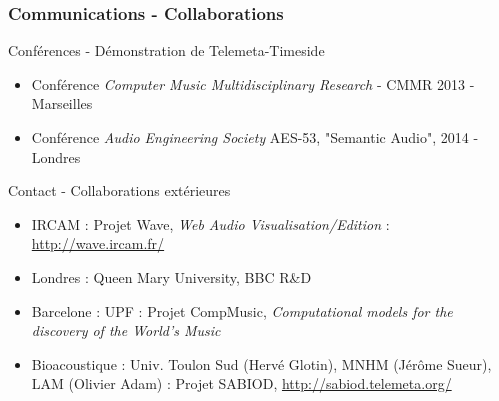 \documentclass[10pt, final, hyperref, table]{beamer}
\begin{document}
\begin{frame}
\frametitle{Communications - Collaborations}
\begin{block}{Conférences - Démonstration de Telemeta-Timeside}
  \begin{itemize}
  \item Conférence \emph{Computer Music Multidisciplinary Research} - CMMR 2013 - Marseilles
  \item Conférence \emph{Audio Engineering Society} AES-53, "Semantic Audio", 2014 - Londres 
  \end{itemize}
\end{block}
\begin{block}{Contact - Collaborations extérieures}
  \begin{itemize}
  \item IRCAM : Projet Wave, \emph{Web Audio Visualisation/Edition} : \url{http://wave.ircam.fr/}
  \item Londres : Queen Mary University, BBC R\&D
  \item Barcelone : UPF :  Projet CompMusic, \emph{Computational models for the discovery of the World’s Music}
  \item Bioacoustique : Univ. Toulon Sud (Hervé Glotin), MNHM (Jérôme Sueur), LAM (Olivier Adam) :  Projet SABIOD, \url{http://sabiod.telemeta.org/}
  \end{itemize}
\end{block}
\end{frame}
\end{document}
